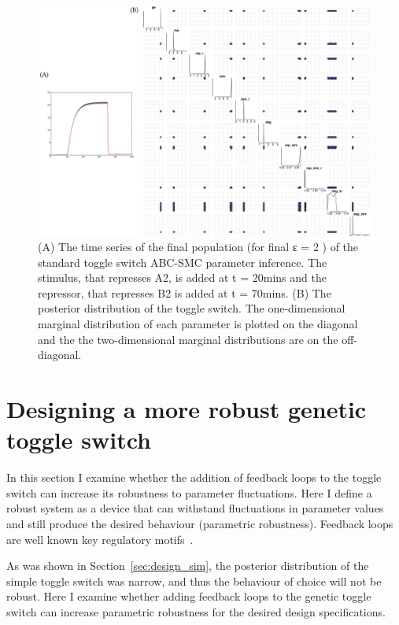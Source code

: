 \begin{figure}[htbp]
    \centering
    \hspace*{-1cm}
    \includegraphics[scale=0.7]{../../chapters/chapterABCSysBio/images/param_inf_res.png}
    \caption[Posterior distribution of the switch obtained from ABC system design]{(A) The time series of the final population (for final ε = 2 ) of the standard toggle switch ABC-SMC parameter inference. The stimulus, that represses A2, is added at t = 20mins and the repressor, that represses B2 is added at t = 70mins. (B) The posterior distribution of the toggle switch. The one-dimensional marginal distribution of each parameter is plotted on the diagonal and the the two-dimensional marginal distributions are on the off-diagonal.}
    \label{fig:stand_abc_timeseries}
\end{figure}
\clearpage
    

\section{Designing a more robust genetic toggle switch}

In this section I examine whether the addition of feedback loops to the toggle switch can increase its robustness to parameter fluctuations. Here I define a robust system as a device that can withstand fluctuations in parameter values and still produce the desired behaviour (parametric robustness). Feedback loops are well known key regulatory motifs~\autocite{Brandman:2005ci}. 

As was shown in Section~\ref{sec:design_sim}, the posterior distribution of the simple toggle switch was narrow, and thus the behaviour of choice will not be robust. Here I examine whether adding feedback loops to the genetic toggle switch can increase parametric robustness for the desired design specifications.

